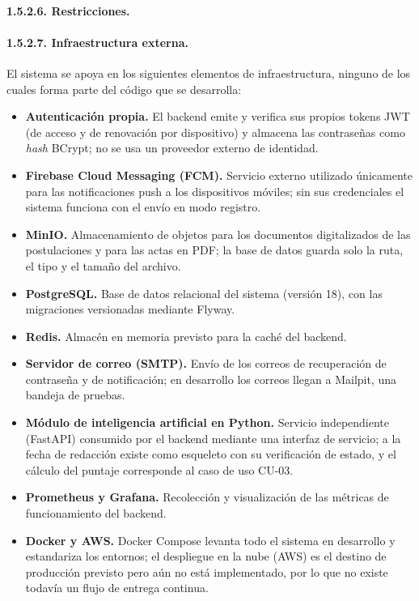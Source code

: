 \paragraph{1.5.2.6. Restricciones.}



\paragraph{1.5.2.7. Infraestructura externa.}

El sistema se apoya en los siguientes elementos de infraestructura, ninguno de los cuales forma parte del código que se desarrolla:

\begin{itemize}
    \item \textbf{Autenticación propia.} El backend emite y verifica sus propios tokens JWT (de acceso y de renovación por dispositivo) y almacena las contraseñas como \textit{hash} BCrypt; no se usa un proveedor externo de identidad.
    \item \textbf{Firebase Cloud Messaging (FCM).} Servicio externo utilizado únicamente para las notificaciones push a los dispositivos móviles; sin sus credenciales el sistema funciona con el envío en modo registro.
    \item \textbf{MinIO.} Almacenamiento de objetos para los documentos digitalizados de las postulaciones y para las actas en PDF; la base de datos guarda solo la ruta, el tipo y el tamaño del archivo.
    \item \textbf{PostgreSQL.} Base de datos relacional del sistema (versión 18), con las migraciones versionadas mediante Flyway.
    \item \textbf{Redis.} Almacén en memoria previsto para la caché del backend.
    \item \textbf{Servidor de correo (SMTP).} Envío de los correos de recuperación de contraseña y de notificación; en desarrollo los correos llegan a Mailpit, una bandeja de pruebas.
    \item \textbf{Módulo de inteligencia artificial en Python.} Servicio independiente (FastAPI) consumido por el backend mediante una interfaz de servicio; a la fecha de redacción existe como esqueleto con su verificación de estado, y el cálculo del puntaje corresponde al caso de uso CU-03.
    \item \textbf{Prometheus y Grafana.} Recolección y visualización de las métricas de funcionamiento del backend.
    \item \textbf{Docker y AWS.} Docker Compose levanta todo el sistema en desarrollo y estandariza los entornos; el despliegue en la nube (AWS) es el destino de producción previsto pero aún no está implementado, por lo que no existe todavía un flujo de entrega continua.
\end{itemize}

